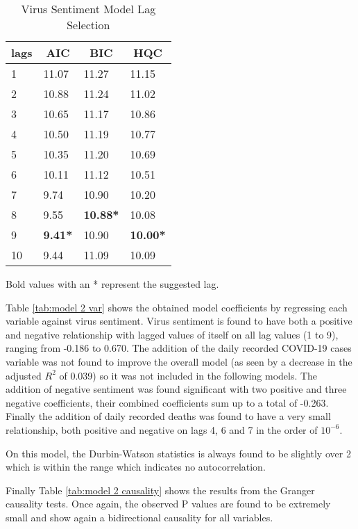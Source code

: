 \begin{table}[H]
\centering
\begin{tabular}{@{}llll@{}}
\toprule
\multicolumn{1}{c}{\textbf{lags}} & \multicolumn{1}{c}{\textbf{AIC}} & \multicolumn{1}{c}{\textbf{BIC}} & \multicolumn{1}{c}{\textbf{HQC}} \\ \midrule
1 & 11.07 & 11.27 & 11.15 \\
2 & 10.88 & 11.24 & 11.02 \\
3 & 10.65 & 11.17 & 10.86 \\
4 & 10.50 & 11.19 & 10.77 \\
5 & 10.35 & 11.20 & 10.69 \\
6 & 10.11 & 11.12 & 10.51 \\
7 & 9.74 & 10.90 & 10.20 \\
8 & 9.55 & \textbf{10.88*} & 10.08 \\
9 & \textbf{9.41*} & 10.90 & \textbf{10.00*} \\
10 & 9.44 & 11.09 & 10.09 \\ \bottomrule
\end{tabular}
\caption{Virus Sentiment Model Lag Selection}
\label{tab:model 2 lag}
Bold values with an * represent the suggested lag.
\end{table}


Table \ref{tab:model 2 var} shows the obtained model coefficients by regressing each variable against virus sentiment. Virus sentiment is found to have both a positive and negative relationship with lagged values of itself on all lag values (1 to 9), ranging from -0.186 to 0.670. The addition of the daily recorded COVID-19 cases variable was not found to improve the overall model (as seen by a decrease in the adjusted $R^2$ of 0.039) so it was not included in the following models.  The addition of negative sentiment was found significant with two positive and three negative coefficients, their combined coefficients sum up to a total of -0.263. Finally the addition of daily recorded deaths was found to have a very small relationship, both positive and negative on lags 4, 6 and 7 in the order of $10^{-6}$.

On this model, the Durbin-Watson statistics is always found to be slightly over 2 which is within the range which indicates no autocorrelation.

Finally Table \ref{tab:model 2 causality} shows the results from the Granger causality tests. Once again, the observed P values are found to be extremely small and show again a bidirectional causality for all variables.

